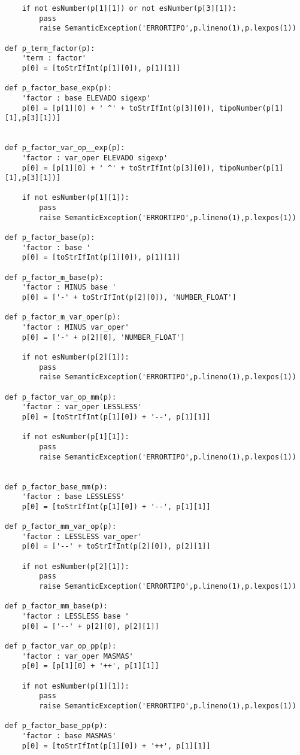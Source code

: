 \begin{verbatim}
    if not esNumber(p[1][1]) or not esNumber(p[3][1]):
        pass
        raise SemanticException('ERRORTIPO',p.lineno(1),p.lexpos(1))

def p_term_factor(p):
    'term : factor'
    p[0] = [toStrIfInt(p[1][0]), p[1][1]]

def p_factor_base_exp(p):
    'factor : base ELEVADO sigexp'
    p[0] = [p[1][0] + ' ^' + toStrIfInt(p[3][0]), tipoNumber(p[1][1],p[3][1])]


def p_factor_var_op__exp(p):
    'factor : var_oper ELEVADO sigexp'
    p[0] = [p[1][0] + ' ^' + toStrIfInt(p[3][0]), tipoNumber(p[1][1],p[3][1])]

    if not esNumber(p[1][1]):
        pass
        raise SemanticException('ERRORTIPO',p.lineno(1),p.lexpos(1))

def p_factor_base(p):
    'factor : base '
    p[0] = [toStrIfInt(p[1][0]), p[1][1]]

def p_factor_m_base(p):
    'factor : MINUS base '
    p[0] = ['-' + toStrIfInt(p[2][0]), 'NUMBER_FLOAT']

def p_factor_m_var_oper(p):
    'factor : MINUS var_oper'
    p[0] = ['-' + p[2][0], 'NUMBER_FLOAT']

    if not esNumber(p[2][1]):
        pass
        raise SemanticException('ERRORTIPO',p.lineno(1),p.lexpos(1))

def p_factor_var_op_mm(p):
    'factor : var_oper LESSLESS'
    p[0] = [toStrIfInt(p[1][0]) + '--', p[1][1]]

    if not esNumber(p[1][1]):
        pass
        raise SemanticException('ERRORTIPO',p.lineno(1),p.lexpos(1))

        
def p_factor_base_mm(p):
    'factor : base LESSLESS'
    p[0] = [toStrIfInt(p[1][0]) + '--', p[1][1]]

def p_factor_mm_var_op(p):
    'factor : LESSLESS var_oper'
    p[0] = ['--' + toStrIfInt(p[2][0]), p[2][1]]

    if not esNumber(p[2][1]):
        pass
        raise SemanticException('ERRORTIPO',p.lineno(1),p.lexpos(1))

def p_factor_mm_base(p):
    'factor : LESSLESS base '
    p[0] = ['--' + p[2][0], p[2][1]]

def p_factor_var_op_pp(p):
    'factor : var_oper MASMAS'
    p[0] = [p[1][0] + '++', p[1][1]]

    if not esNumber(p[1][1]):
        pass
        raise SemanticException('ERRORTIPO',p.lineno(1),p.lexpos(1))

def p_factor_base_pp(p):
    'factor : base MASMAS'
    p[0] = [toStrIfInt(p[1][0]) + '++', p[1][1]]


\end{verbatim}
